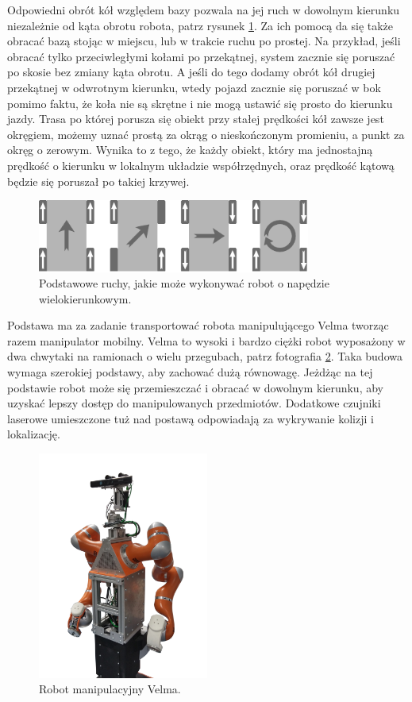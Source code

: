 Odpowiedni obrót kół względem bazy pozwala na jej ruch w dowolnym kierunku niezależnie od kąta obrotu robota, patrz rysunek \ref{fig:mecanum_dirs}.
Za ich pomocą da się także obracać bazą stojąc w miejscu, lub w trakcie ruchu po prostej.
Na przykład, jeśli obracać tylko przeciwległymi kołami po przekątnej, system zacznie się poruszać po skosie bez zmiany kąta obrotu.
A jeśli do tego dodamy obrót kół drugiej przekątnej w odwrotnym kierunku, wtedy pojazd zacznie się poruszać w bok pomimo faktu, że koła nie są skrętne i nie mogą ustawić się prosto do kierunku jazdy.
Trasa po której porusza się obiekt przy stałej prędkości kół zawsze jest okręgiem, możemy uznać prostą za okrąg o nieskończonym promieniu, a punkt za okręg o zerowym.
Wynika to z tego, że każdy obiekt, który ma jednostajną prędkość o kierunku w lokalnym układzie współrzędnych, oraz prędkość kątową będzie się poruszał po takiej krzywej.

\begin{figure}[H]
\centering
 \includegraphics[width=0.8\textwidth]{graphics/mecanum_dirs.pdf}
\caption{Podstawowe ruchy, jakie może wykonywać robot o napędzie wielokierunkowym.}
\label{fig:mecanum_dirs}
\end{figure} 

Podstawa ma za zadanie transportować robota manipulującego Velma tworząc razem manipulator mobilny.
Velma to wysoki i bardzo ciężki robot wyposażony w dwa chwytaki na ramionach o wielu przegubach, patrz fotografia \ref{fig:velma}.
Taka budowa wymaga szerokiej podstawy, aby zachować dużą równowagę.
Jeżdżąc na tej podstawie robot może się przemieszczać i obracać w dowolnym kierunku, aby uzyskać lepszy dostęp do manipulowanych przedmiotów.
Dodatkowe czujniki laserowe umieszczone tuż nad postawą odpowiadają za wykrywanie kolizji i lokalizację.

\begin{figure}[H]
\centering
 \includegraphics[width=0.5\textwidth]{graphics/velma.png}
\caption{Robot manipulacyjny Velma.}
\label{fig:velma}
\end{figure} 

